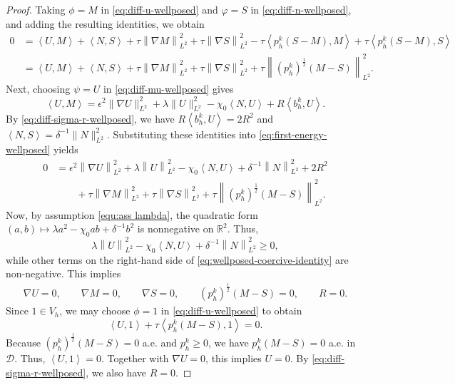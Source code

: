 \documentclass[11pt, reqno]{amsart}
\theoremstyle{definition}
\numberwithin{equation}{section}
\newcommand{\norm}[2]{\left\|{#1}\right\|_{#2}}
\newcommand{\inpro}[2]{\left\langle#1,#2\right\rangle}
\begin{document}
{\begin{proof}
		Taking $\phi=M$ in \eqref{eq:diff-u-wellposed} and $\varphi=S$ in \eqref{eq:diff-n-wellposed}, and adding the resulting identities, we obtain
		\begin{align}
			\label{eq:first-energy-wellposed}
			0
			&=
			\inpro{U}{M}
			+
			\inpro{N}{S}
			+
			\tau\norm{\nabla M}{L^2}^2
			+
			\tau\norm{\nabla S}{L^2}^2
			- 
			\tau\inpro{p_h^k(S-M)}{M}
			+
			\tau\inpro{p_h^k(S-M)}{S}
			\nonumber\\
			&=
			\inpro{U}{M}
			+
			\inpro{N}{S}
			+
			\tau\norm{\nabla M}{L^2}^2
			+
			\tau\norm{\nabla S}{L^2}^2
			+
			\tau\norm{(p_h^k)^{\frac12} (M-S)}{L^2}^2.
		\end{align}
		Next, choosing $\psi=U$ in \eqref{eq:diff-mu-wellposed} gives
		\[
		\inpro{U}{M}
		=
		\epsilon^2\|\nabla U\|_{L^2}^2
		+
		\lambda\|U\|_{L^2}^2
		-
		\chi_0\inpro{N}{U}
		+
		R\inpro{b_h^k}{U}.
		\]
		By \eqref{eq:diff-sigma-r-wellposed}, we have $R\inpro{b_h^k}{U}=2R^2$ and
		$\inpro{N}{S}
		=
		\delta^{-1}\|N\|_{L^2}^2$.
		Substituting these identities into \eqref{eq:first-energy-wellposed} yields
		\begin{align}
			\label{eq:wellposed-coercive-identity}
			0
			&=
			\epsilon^2 \norm{\nabla U}{L^2}^2
			+
			\lambda \norm{U}{L^2}^2
			-
			\chi_0\inpro{N}{U}
			+
			\delta^{-1} \norm{N}{L^2}^2
			+
			2R^2
			\nonumber\\
			&\qquad
			+
			\tau \norm{\nabla M}{L^2}^2
			+
			\tau \norm{\nabla S}{L^2}^2
			+
			\tau \norm{(p_h^k)^{\frac12} (M-S)}{L^2}^2.
		\end{align}
		Now, by assumption \eqref{equ:ass lambda}, the quadratic form
		$(a,b)\mapsto \lambda a^2-\chi_0 ab+\delta^{-1}b^2$
		is nonnegative on $\mathbb R^2$. Thus,
		\[
		\lambda \norm{U}{L^2}^2
		-
		\chi_0\inpro{N}{U}
		+
		\delta^{-1} \norm{N}{L^2}^2
		\ge0,
		\]
		while other terms on the right-hand side of
		\eqref{eq:wellposed-coercive-identity} are non-negative. This implies
		\begin{align}\label{equ:UMS}
			\nabla U=0,
			\qquad
			\nabla M=0,
			\qquad
			\nabla S=0,
			\qquad
			(p_h^k)^{\frac12}(M-S)=0,
			\qquad
			R=0.
		\end{align}
		Since $1\in V_h$, we may choose $\phi=1$ in \eqref{eq:diff-u-wellposed} to obtain
		\[
		\inpro{U}{1}
		+
		\tau\inpro{p_h^k(M-S)}{1}
		=0.
		\]
		Because $(p_h^k)^{\frac12}(M-S)=0$ a.e. and $p_h^k\ge0$, we have $p_h^k(M-S)=0$ a.e. in $\mathscr D$. Thus, $\inpro{U}{1}=0$.
		Together with $\nabla U=0$, this implies $U=0$. By \eqref{eq:diff-sigma-r-wellposed}, we also have $R=0$.
		

\end{proof}}
\end{document}
